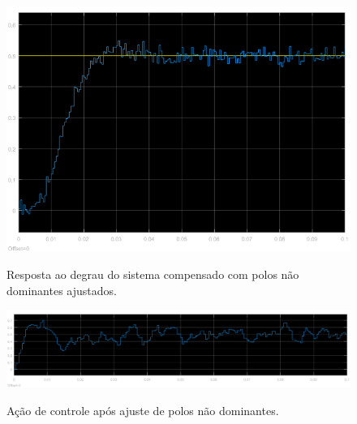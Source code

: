\documentclass[
	article,			%
	11pt,				%
	oneside,			%
	a4paper,			%
	english,			%
	brazil,				%
	sumario=tradicional
	]{abntex2}
\begin{document}
\begin{figure}[htb!]
	\centering
	\caption{Resposta ao degrau do sistema compensado com polos não dominantes ajustados.}
	\includegraphics[scale=0.55]{./img/stepCtrlObs_ajustado_2.png}
	\label{fig:stepCtrlObs_ajustado_2}
\end{figure}

\begin{figure}[htb!]
	\centering
	\caption{Ação de controle após ajuste de polos não dominantes.}
	\includegraphics[scale=0.6]{./img/stepCtrlObs_wng_ajustado_ctrlAction.png}
	\label{fig:stepCtrlObs_wng_ajustado_ctrlAction}
\end{figure}

\pagebreak
\end{document}
